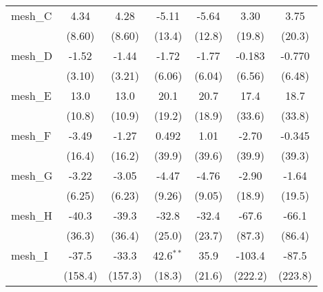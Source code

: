 \begin{tabular}{lcccccc}
   mesh\_C                                                     & 4.34         & 4.28         & -5.11          & -5.64          & 3.30    & 3.75\\   
                                                               & (8.60)       & (8.60)       & (13.4)         & (12.8)         & (19.8)  & (20.3)\\   
   mesh\_D                                                     & -1.52        & -1.44        & -1.72          & -1.77          & -0.183  & -0.770\\   
                                                               & (3.10)       & (3.21)       & (6.06)         & (6.04)         & (6.56)  & (6.48)\\   
   mesh\_E                                                     & 13.0         & 13.0         & 20.1           & 20.7           & 17.4    & 18.7\\   
                                                               & (10.8)       & (10.9)       & (19.2)         & (18.9)         & (33.6)  & (33.8)\\   
   mesh\_F                                                     & -3.49        & -1.27        & 0.492          & 1.01           & -2.70   & -0.345\\   
                                                               & (16.4)       & (16.2)       & (39.9)         & (39.6)         & (39.9)  & (39.3)\\   
   mesh\_G                                                     & -3.22        & -3.05        & -4.47          & -4.76          & -2.90   & -1.64\\   
                                                               & (6.25)       & (6.23)       & (9.26)         & (9.05)         & (18.9)  & (19.5)\\   
   mesh\_H                                                     & -40.3        & -39.3        & -32.8          & -32.4          & -67.6   & -66.1\\   
                                                               & (36.3)       & (36.4)       & (25.0)         & (23.7)         & (87.3)  & (86.4)\\   
   mesh\_I                                                     & -37.5        & -33.3        & 42.6$^{**}$    & 35.9           & -103.4  & -87.5\\   
                                                               & (158.4)      & (157.3)      & (18.3)         & (21.6)         & (222.2) & (223.8)\\   

\end{tabular}

